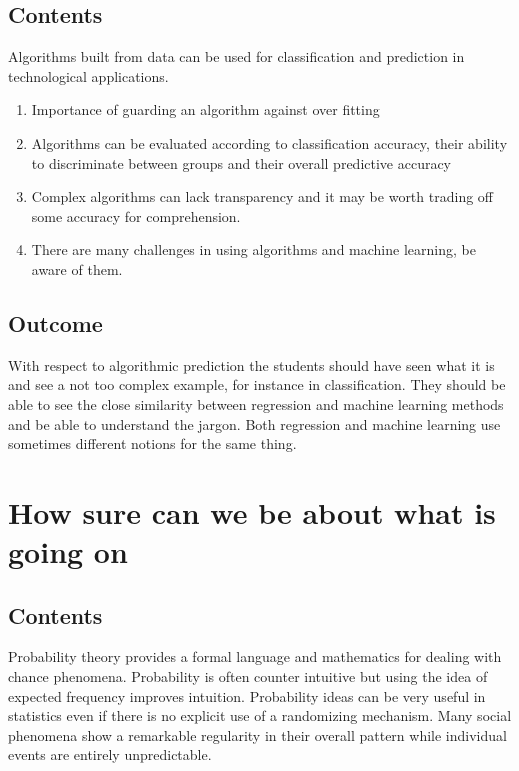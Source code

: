 \documentclass[
  letterpaper,
]{scrbook}
\providecommand{\tightlist}{%
  \setlength{\itemsep}{0pt}\setlength{\parskip}{0pt}}\usepackage{longtable,booktabs,array}
\begin{document}
\hypertarget{contents-5}{%
\section{Contents}\label{contents-5}}

Algorithms built from data can be used for classification and prediction
in technological applications.

\begin{enumerate}
\def\labelenumi{\arabic{enumi}.}
\tightlist
\item
  Importance of guarding an algorithm against over fitting
\item
  Algorithms can be evaluated according to classification accuracy,
  their ability to discriminate between groups and their overall
  predictive accuracy
\item
  Complex algorithms can lack transparency and it may be worth trading
  off some accuracy for comprehension.
\item
  There are many challenges in using algorithms and machine learning, be
  aware of them.
\end{enumerate}

\hypertarget{outcome-5}{%
\section{Outcome}\label{outcome-5}}

With respect to algorithmic prediction the students should have seen
what it is and see a not too complex example, for instance in
classification. They should be able to see the close similarity between
regression and machine learning methods and be able to understand the
jargon. Both regression and machine learning use sometimes different
notions for the same thing.


\hypertarget{how-sure-can-we-be-about-what-is-going-on}{%
\chapter{How sure can we be about what is going
on}\label{how-sure-can-we-be-about-what-is-going-on}}

\hypertarget{contents-6}{%
\section{Contents}\label{contents-6}}

Probability theory provides a formal language and mathematics for
dealing with chance phenomena. Probability is often counter intuitive
but using the idea of expected frequency improves intuition. Probability
ideas can be very useful in statistics even if there is no explicit use
of a randomizing mechanism. Many social phenomena show a remarkable
regularity in their overall pattern while individual events are entirely
unpredictable.
\end{document}

